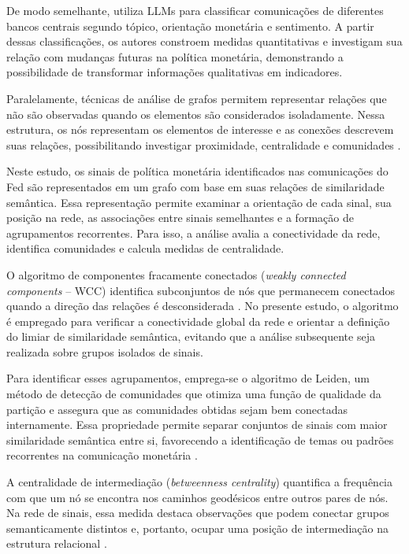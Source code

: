 De modo semelhante, \cite{silva2025text} utiliza LLMs para classificar
comunicações de diferentes bancos centrais segundo tópico, orientação monetária e
sentimento. A partir dessas classificações, os autores constroem medidas
quantitativas e investigam sua relação com mudanças futuras na política monetária,
demonstrando a possibilidade de transformar informações qualitativas em indicadores.

Paralelamente, técnicas de análise de grafos permitem representar relações que não
são observadas quando os elementos são considerados isoladamente. Nessa estrutura,
os nós representam os elementos de interesse e as conexões descrevem suas relações,
possibilitando investigar proximidade, centralidade e comunidades
\citep{needham2019graph}.

Neste estudo, os sinais de política monetária identificados nas comunicações do Fed
são representados em um grafo com base em suas relações de similaridade semântica.
Essa representação permite examinar a orientação de cada sinal, sua posição na rede,
as associações entre sinais semelhantes e a formação de agrupamentos recorrentes.
Para isso, a análise avalia a conectividade da rede, identifica comunidades e calcula
medidas de centralidade.

O algoritmo de componentes fracamente conectados (\textit{weakly connected
components} -- WCC) identifica subconjuntos de nós que permanecem conectados
quando a direção das relações é desconsiderada \citep{needham2019graph}. No presente 
estudo, o algoritmo é
empregado para verificar a conectividade global da rede e orientar a definição do
limiar de similaridade semântica, evitando que a análise subsequente seja realizada
sobre grupos isolados de sinais.

Para identificar esses agrupamentos, emprega-se o algoritmo de Leiden, um método de
detecção de comunidades que otimiza uma função de qualidade da partição e assegura que
as comunidades obtidas sejam bem conectadas internamente. Essa propriedade permite
separar conjuntos de sinais com maior similaridade semântica entre si, favorecendo a
identificação de temas ou padrões recorrentes na comunicação monetária
\citep{traag2019louvain}.

A centralidade de intermediação (\textit{betweenness centrality}) quantifica a
frequência com que um nó se encontra nos caminhos geodésicos entre outros pares de
nós. Na rede de sinais, essa medida destaca observações que podem conectar grupos
semanticamente distintos e, portanto, ocupar uma posição de intermediação na
estrutura relacional \citep{freeman1977set}.

